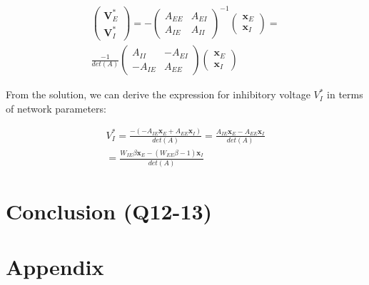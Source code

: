 \documentclass[10pt,twocolumn]{article}
\begin{document}
$$
    \begin{align*}
        \begin{pmatrix}
            \textbf{V}^\ast_E \\ \textbf{V}^\ast_I
        \end{pmatrix}
        =
        -\begin{pmatrix}
             A_{EE} & A_{EI} \\
             A_{IE} & A_{II}
         \end{pmatrix}^{-1}
        \begin{pmatrix}
            \textbf{x}_E \\ \textbf{x}_I
        \end{pmatrix}
        =
        \\
        \frac{-1}{det(A)}
        \begin{pmatrix}
            A_{II}  & -A_{EI} \\
            -A_{IE} & A_{EE}
        \end{pmatrix}
        \begin{pmatrix}
            \textbf{x}_E \\ \textbf{x}_I
        \end{pmatrix}
    \end{align*}
$$

From the solution, we can derive the expression for
inhibitory voltage $V^\ast_I$ in terms of network parameters:

$$
    \begin{align*}
        V^\ast_I
        = \frac{-(- A_{IE}\textbf{x}_E + A_{EE}\textbf{x}_I)}{det(A)}
        = \frac{A_{IE}\textbf{x}_E - A_{EE}\textbf{x}_I}{det(A)}
        \\
        = \frac{W_{IE}\beta \textbf{x}_E - (W_{EE}\beta - 1) \textbf{x}_I}{det(A)}
    \end{align*}
$$





\section{Conclusion (Q12-13)}

\clearpage
\printbibliography

\clearpage
\appendix
\section{Appendix}
\label{Code}
% 
\end{document}
